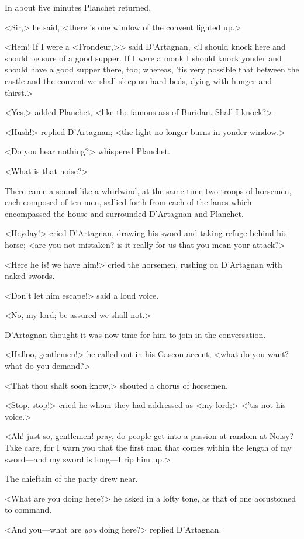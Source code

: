 In about five minutes Planchet returned.

<Sir,> he said, <there is one window of the convent lighted up.>

<Hem! If I were a <Frondeur,>> said D'Artagnan, <I should knock here and should be sure of a good supper. If I were a monk I should knock yonder and should have a good supper there, too; whereas, 'tis very possible that between the castle and the convent we shall sleep on hard beds, dying with hunger and thirst.>

<Yes,> added Planchet, <like the famous ass of Buridan. Shall I knock?>

<Hush!> replied D'Artagnan; <the light no longer burns in yonder window.>

<Do you hear nothing?> whispered Planchet.

<What is that noise?>

There came a sound like a whirlwind, at the same time two troops of horsemen, each composed of ten men, sallied forth from each of the lanes which encompassed the house and surrounded D'Artagnan and Planchet.

<Heyday!> cried D'Artagnan, drawing his sword and taking refuge behind his horse; <are you not mistaken? is it really for us that you mean your attack?>

<Here he is! we have him!> cried the horsemen, rushing on D'Artagnan with naked swords.

<Don't let him escape!> said a loud voice.

<No, my lord; be assured we shall not.>

D'Artagnan thought it was now time for him to join in the conversation.

<Halloo, gentlemen!> he called out in his Gascon accent, <what do you want? what do you demand?>

<That thou shalt soon know,> shouted a chorus of horsemen.

<Stop, stop!> cried he whom they had addressed as <my lord;> <'tis not his voice.>

<Ah! just so, gentlemen! pray, do people get into a passion at random at Noisy? Take care, for I warn you that the first man that comes within the length of my sword—and my sword is long—I rip him up.>

The chieftain of the party drew near.

<What are you doing here?> he asked in a lofty tone, as that of one accustomed to command.

<And you—what are \emph{you} doing here?> replied D'Artagnan.

